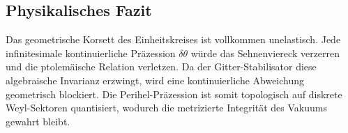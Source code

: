 \documentclass[11pt,a4paper]{article}
\begin{document}
\subsection*{Physikalisches Fazit}
Das geometrische Korsett des Einheitskreises ist vollkommen unelastisch. Jede infinitesimale kontinuierliche Präzession $\delta\theta$ würde das Sehnenviereck verzerren und die ptolemäische Relation verletzen. Da der Gitter-Stabilisator diese algebraische Invarianz erzwingt, wird eine kontinuierliche Abweichung geometrisch blockiert. Die Perihel-Präzession ist somit topologisch auf diskrete Weyl-Sektoren quantisiert, wodurch die metrizierte Integrität des Vakuums gewahrt bleibt.
\end{document}
